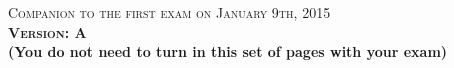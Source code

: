 \documentclass{docist}
\begin{document}
\thispagestyle{empty}

\begin{center}
  {\Large \textsc{Companion to the first exam on January 9th, 2015\\[2ex]
  \textbf{Version: A}\\[2ex]}}
  {\normalsize  \textbf{(You do not need to turn in this set of pages with your exam)}}
\end{center}



\qArchitectureInfluenceCycle

\qTechoGeeks

\qFeaturitisOrderPad

\qArchitectureDefinition

\qModuleComponent

\qScenario

\qChecksum

\qAttack

\qSocialCalcTactics

\qThousandParsecTactics

\qGitTactics

\qDesigningArchitecture

\qDecompositionGeneralization

\qUsesStyle

\qLayered

\qInterfaceDelegation

\qRepository

\qPeerToPeer

\qPipesFilters

\qInstallView

\qThounsandParsecView

\qSocialCalcView

\qGitViews

\qOrderPad

\qEtherCalcAllocation

\qEtherCalcRedundancy

\qEtherCalcSnapshotPerformance

\qEtherCalcModifiabilityTestability

\qServiceLayer

\qActiveRecord
\end{document}
